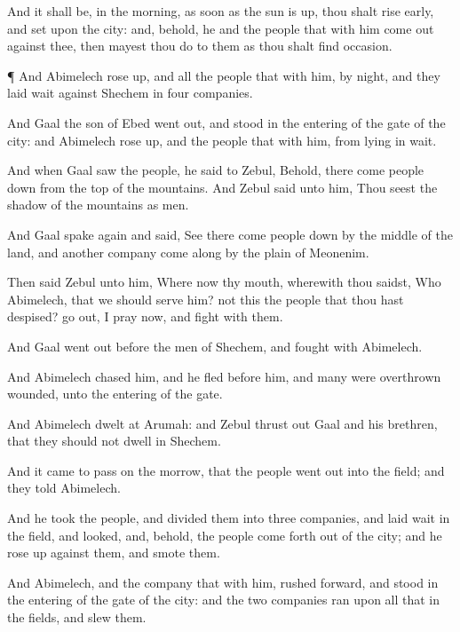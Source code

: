 {And it shall be,
{} in the
morning, as soon as the
sun is
up, thou shalt rise
early, and
set upon the
city: and, behold,
{} he and the
people that
{} with him come
out against thee, then mayest thou
do to them as
thou shalt find
occasion.


\par }{\PP {}¶ And
Abimelech rose
up, and all the
people that
{} with him, by
night, and they laid
wait against
Shechem in
four
companies.

And
Gaal the
son of
Ebed went
out, and
stood in the
entering of the
gate of the
city: and
Abimelech rose
up, and the
people that
{} with him, from lying in
wait.

And when
Gaal
saw the
people, he
said to
Zebul, Behold, there
come
people
down from the
top of the
mountains. And
Zebul
said unto him, Thou
seest the
shadow of the
mountains as
{}
men.

And
Gaal
spake
again and
said, See there
come
people
down by the
middle of the
land, and
another
company
come along by the
plain
of
Meonenim.

Then
said
Zebul unto him, Where
{}
now thy
mouth, wherewith thou
saidst, Who
{}
Abimelech, that we should
serve him?
{} not this the
people that thou hast
despised? go
out, I pray
now, and
fight with them.

And
Gaal went
out
before the
men of
Shechem, and
fought with
Abimelech.

And
Abimelech
chased him, and he
fled
before him, and
many were
overthrown
{}
wounded,
{} unto the
entering of the
gate.

And
Abimelech
dwelt at
Arumah: and
Zebul thrust
out
Gaal and his
brethren, that they should not
dwell in
Shechem.

And it came to pass on the
morrow, that the
people went
out into the
field; and they
told
Abimelech.

And he
took the
people, and
divided them into
three
companies, and laid
wait in the
field, and
looked, and, behold, the
people
{} come
forth out of the
city; and he rose
up against them, and
smote them.

And
Abimelech, and the
company that
{} with him, rushed
forward, and
stood in the
entering of the
gate of the
city: and the
two
{}
companies ran
upon all
{} that
{} in the
fields, and
slew them.

}

